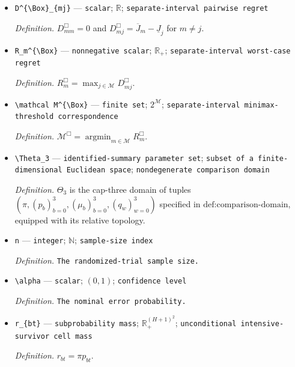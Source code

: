 \documentclass{article}
\begin{document}
\begin{itemize}
  \item \texttt{D\textasciicircum{}\{\textbackslash{}\allowbreak{}Box\}\allowbreak{}\_\allowbreak{}\{mj\}\allowbreak{}} --- \texttt{scalar}; \(\mathbb R\); \texttt{separate-\allowbreak{}interval pairwise regret}
  \par\smallskip\noindent\emph{Definition.} \(D^{\Box}_{mm}=0\) and \(D^{\Box}_{mj}=\overline J_m-\underline J_j\) for \(m\ne j\).
  \item \texttt{R\_\allowbreak{}m\textasciicircum{}\{\textbackslash{}\allowbreak{}Box\}\allowbreak{}} --- \texttt{nonnegative scalar}; \(\mathbb R_+\); \texttt{separate-\allowbreak{}interval worst-\allowbreak{}case regret}
  \par\smallskip\noindent\emph{Definition.} \(R_m^{\Box}=\max_{j\in\mathcal M}D^{\Box}_{mj}\).
  \item \texttt{\textbackslash{}\allowbreak{}mathcal M\textasciicircum{}\{\textbackslash{}\allowbreak{}Box\}\allowbreak{}} --- \texttt{finite set}; \(2^{\mathcal M}\); \texttt{separate-\allowbreak{}interval minimax-\allowbreak{}threshold correspondence}
  \par\smallskip\noindent\emph{Definition.} \(\mathcal M^{\Box}=\operatorname*{argmin}_{m\in\mathcal M}R_m^{\Box}\).
  \item \texttt{\textbackslash{}\allowbreak{}Theta\_\allowbreak{}3} --- \texttt{identified-\allowbreak{}summary parameter set}; \texttt{subset of a finite-\allowbreak{}dimensional Euclidean space}; \texttt{nondegenerate comparison domain}
  \par\smallskip\noindent\emph{Definition.} \(\Theta_3\) is the cap-three domain of tuples \((\pi,(p_b)_{b=0}^{3},(\mu_b)_{b=0}^{3},(q_w)_{w=0}^{3})\) specified in \(\text{def:comparison-domain}\), equipped with its relative topology.
  \item \texttt{n} --- \texttt{integer}; \(\mathbb N\); \texttt{sample-\allowbreak{}size index}
  \par\smallskip\noindent\emph{Definition.} \texttt{The randomized-\allowbreak{}trial sample size.}
  \item \texttt{\textbackslash{}\allowbreak{}alpha} --- \texttt{scalar}; \((0,1)\); \texttt{confidence level}
  \par\smallskip\noindent\emph{Definition.} \texttt{The nominal error probability.}
  \item \texttt{r\_\allowbreak{}\{bt\}\allowbreak{}} --- \texttt{subprobability mass}; \(\mathbb R_+^{(H+1)^2}\); \texttt{unconditional intensive-\allowbreak{}survivor cell mass}
  \par\smallskip\noindent\emph{Definition.} \(r_{bt}=\pi p_{bt}\).

\end{itemize}
\end{document}
